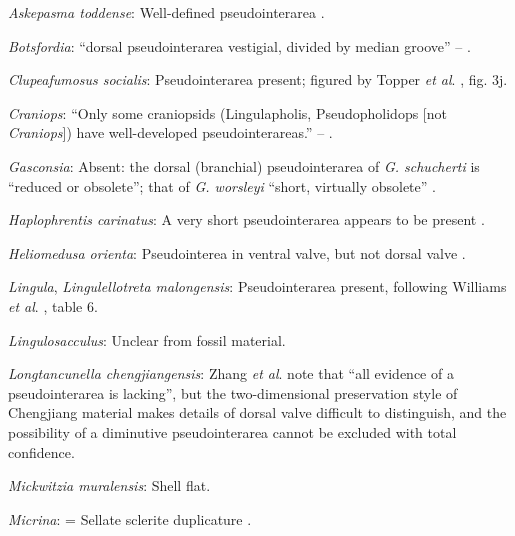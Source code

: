 \documentclass[openany]{book}
\theoremstyle{definition}
\theoremstyle{definition}
\theoremstyle{definition}
\theoremstyle{remark}
\begin{document}
\hypertarget{Askepasma_toddense-coding-76}{}
\emph{Askepasma toddense}: Well-defined pseudointerarea
\citep[p153]{Williams2000LinguliformeaCraniiformea}.

\hypertarget{Botsfordia-coding-76}{}
\emph{Botsfordia}: ``dorsal pseudointerarea vestigial, divided by median
groove'' -- \citet{Williams2000LinguliformeaCraniiformea}.

\hypertarget{Clupeafumosus_socialis-coding-76}{}
\emph{Clupeafumosus socialis}: Pseudointerarea present; figured by
Topper \emph{et al}. \citeyearpar{Topper2013Reappraisalof}, fig. 3j.

\hypertarget{Craniops-coding-76}{}
\emph{Craniops}: ``Only some craniopsids (Lingulapholis, Pseudopholidops
{[}not \emph{Craniops}{]}) have well-developed pseudointerareas.'' --
\citet{Williams2000LinguliformeaCraniiformea}.

\hypertarget{Gasconsia-coding-76}{}
\emph{Gasconsia}: Absent: the dorsal (branchial) pseudointerarea of
\emph{G. schucherti} is ``reduced or obsolete''; that of \emph{G.
worsleyi} ``short, virtually obsolete'' \citep{Hanken1985Thetaxonomy}.

\hypertarget{Haplophrentis_carinatus-coding-76}{}
\emph{Haplophrentis carinatus}: A very short pseudointerarea appears to
be present \citep{Moysiuk2017Hyolithsare}.

\hypertarget{Heliomedusa_orienta-coding-76}{}
\emph{Heliomedusa orienta}: Pseudointerea in ventral valve, but not
dorsal valve \citep[2007]{Williams2000LinguliformeaCraniiformea}.

\hypertarget{Lingula-coding-76}{}
\emph{Lingula}, \emph{Lingulellotreta malongensis}: Pseudointerarea
present, following Williams \emph{et al}.
\citeyearpar{Williams2000LinguliformeaCraniiformea}, table 6.

\hypertarget{Lingulosacculus-coding-76}{}
\emph{Lingulosacculus}: Unclear from fossil material.

\hypertarget{Longtancunella_chengjiangensis-coding-76}{}
\emph{Longtancunella chengjiangensis}: Zhang \emph{et al}.
\citeyearpar{Zhang2011Theexceptionally} note that ``all evidence of a
pseudointerarea is lacking'', but the two-dimensional preservation style
of Chengjiang material makes details of dorsal valve difficult to
distinguish, and the possibility of a diminutive pseudointerarea cannot
be excluded with total confidence.

\hypertarget{Mickwitzia_muralensis-coding-76}{}
\emph{Mickwitzia muralensis}: Shell flat.

\hypertarget{Micrina-coding-76}{}
\emph{Micrina}: = Sellate sclerite duplicature
\citep{Holmer2008TheEarly}.
\end{document}
